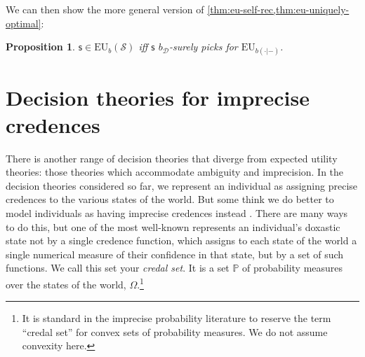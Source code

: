 \documentclass[a4paper]{article}
\newtheorem{proposition}[theorem]{Proposition}
\renewcommand\P{\mathbb{P}} %
\newcommand\EU{\mathrm{EU}}
\newcommand{\Decs}{\mathcal{D}}
\renewcommand\S{\mathcal{S}}
\newcommand\s{\mathsf{s}}
\newcommand{\IP}{\P}
\newcommand{\todoold}[2][]{\todo[backgroundcolor=white,bordercolor=orange!10,linecolor=gray!10, #1,caption={},textcolor=gray]{Pre-rev: #2}}
\newcommand{\todooldinfo}[2][]{\todoold[#1]{#2}}
\newcommand{\Strategies}{\S}
\newenvironment{CCM rewritten}
{\begingroup\color{blue}} %
{\endgroup}              %
\begin{document}
We can then show the more general version of \cref{thm:eu-self-rec,thm:eu-uniquely-optimal}:
\begin{proposition}\label{thm:eu-dep}
	$\s\in\EU_b(\Strategies)$ iff $\s$ $b_\Decs$-surely picks for $\EU_{b(\cdot|-)}$.
\end{proposition}








\section{Decision theories for imprecise credences}

There is another range of decision theories that diverge from expected utility theories: those theories which accommodate ambiguity and imprecision. In the decision theories considered so far, we represent an individual as assigning precise credences to the various states of the world. But some think we do better to model individuals as having imprecise credences instead \citep{walley1991srip, bradley2016ip}. There are many ways to do this, but one of the most well-known represents an individual's doxastic state not by a single credence function, which assigns to each state of the world a single numerical measure of their confidence in that state, but by a set of such functions. We call this set your \emph{credal set}. It is a set $\IP$ of probability measures over the states of the world, $\Omega$.\footnote{{It is standard in the imprecise probability literature to reserve the term ``credal set'' for convex sets of probability measures. We do not assume convexity here.}}
\end{document}
